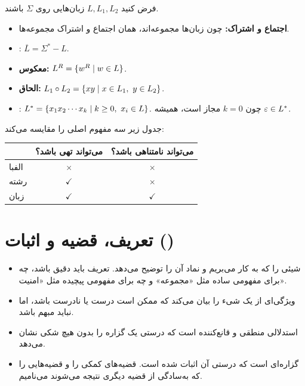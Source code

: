 \begin{definition}
فرض کنید $L,L_1,L_2$ زبان‌هایی روی $\Sigma$ باشند.
\begin{itemize}
\item \textbf{اجتماع و اشتراک:} چون زبان‌ها مجموعه‌اند، همان اجتماع و اشتراک مجموعه‌ها.
\item {}: $\overline{L}=\Sigma^*-L$.
\item \textbf{معکوس:} $L^R=\{w^R\mid w\in L\}$.
\item \textbf{الحاق:} $L_1\circ L_2=\{xy\mid x\in L_1,\ y\in L_2\}$.
\item {}: $L^*=\{x_1x_2\cdots x_k\st k\ge0,\ x_i\in L\}$. چون $k=0$ مجاز است، همیشه $\varepsilon\in L^*$.
\end{itemize}
\end{definition}

جدول زیر سه مفهوم اصلی را مقایسه می‌کند:
\begin{center}
\begin{tabular}{lcc}
\toprule
 & می‌تواند تهی باشد؟ & می‌تواند نامتناهی باشد؟\\
\midrule
الفبا & \textcolor{warnFrame}{$\times$} & \textcolor{warnFrame}{$\times$}\\
رشته & \textcolor{exFrame}{$\checkmark$} & \textcolor{warnFrame}{$\times$}\\
زبان & \textcolor{exFrame}{$\checkmark$} & \textcolor{exFrame}{$\checkmark$}\\
\bottomrule
\end{tabular}
\end{center}

\section{تعریف، قضیه و اثبات ()}

\begin{definition}
\begin{itemize}
\item {} شیئی را که به کار می‌بریم و نماد آن را توضیح می‌دهد. تعریف باید دقیق باشد، چه برای مفهومی ساده مثل «مجموعه» و چه برای مفهومی پیچیده مثل «امنیت».
\item {} ویژگی‌ای از یک شیء را بیان می‌کند که ممکن است درست یا نادرست باشد، اما نباید مبهم باشد.
\item {} استدلالی منطقی و قانع‌کننده است که درستی یک گزاره را بدون هیچ شکی نشان می‌دهد.
\item {} گزاره‌ای است که درستی آن اثبات شده است. قضیه‌های کمکی را  و قضیه‌هایی را که به‌سادگی از قضیه دیگری نتیجه می‌شوند  می‌نامیم.
\end{itemize}
\end{definition}

